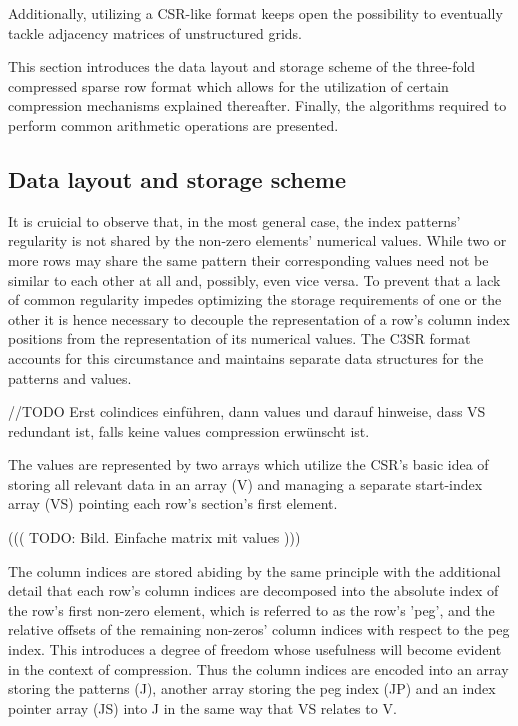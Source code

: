 \documentclass{article}
\begin{document}
  Additionally, utilizing a CSR-like format keeps open the possibility to eventually tackle adjacency matrices of
  unstructured grids.

  This section introduces the data layout and storage scheme of the three-fold compressed sparse row format which allows
  for the utilization of certain compression mechanisms explained thereafter. Finally, the algorithms required to
  perform common arithmetic operations are presented.

  \subsection{Data layout and storage scheme}


    It is cruicial to observe that, in the most general case, the index patterns' regularity is not shared by the non-zero elements' numerical values. While two or more rows may share the same pattern their corresponding values need not be similar to each other at all and, possibly, even vice versa. To prevent that a lack of common regularity impedes optimizing the storage requirements of one or the other it is hence necessary to decouple the representation of a row's column index positions from the representation of its numerical values. The C3SR format accounts for this circumstance and maintains separate data structures for the patterns and values.

    //TODO Erst colindices einführen, dann values und darauf hinweise, dass VS redundant ist, falls keine values
    compression erwünscht ist.

    The values are represented by two arrays which utilize the CSR's basic idea of storing all relevant data in an array (V) and managing a separate start-index array (VS) pointing each row's section's first element.

      ((( TODO: Bild. Einfache matrix mit values )))

    The column indices are stored abiding by the same principle with the additional detail that each row's column indices are decomposed into the absolute index of the row's first non-zero element, which is referred to as the row's 'peg', and the relative offsets of the remaining non-zeros' column indices with respect to the peg index.  This introduces a degree of freedom whose usefulness will become evident in the context of compression. Thus the column indices are encoded into an array storing the patterns (J), another array storing the peg index (JP) and an index pointer array (JS) into J in the same way that VS relates to V.
\end{document}
